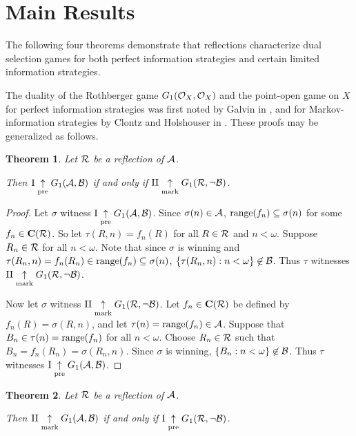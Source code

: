 \documentclass{amsart}
\theoremstyle{plain}
\newtheorem{theorem}{Theorem}
\theoremstyle{definition}
\theoremstyle{remark}
\theoremstyle{plain}
\theoremstyle{definition}
\theoremstyle{remark}
\begin{document}
\section{Main Results}

The following four theorems demonstrate that reflections characterize
dual selection games for both perfect information strategies and
certain limited information strategies.

The duality of the Rothberger game \(G_{1}(\mathcal{O}_X,\mathcal{O}_X)\)
and the point-open game on \(X\) for perfect information strategies
was first noted by Galvin in \cite{MR0493925}, and
for Markov-information strategies by Clontz and Holshouser in
\cite{2018arXiv180606001C}. These proofs may be generalized as follows.

\begin{theorem}
  Let \(\mathcal{R}\) be a reflection of \(\mathcal{A}\). 

  Then
  \(\mathrm{I}\underset{\text{pre}}{\uparrow}G_{1}(\mathcal{A},\mathcal{B})\) if and only if
  \(\mathrm{II}\underset{\text{mark}}{\uparrow}G_{1}(\mathcal{R},\neg\mathcal{B})\).
\end{theorem}

\begin{proof}
  Let \(\sigma\) witness 
  \(\mathrm{I}\underset{\text{pre}}{\uparrow}G_{1}(\mathcal{A},\mathcal{B})\).
  Since \(\sigma(n)\in\mathcal{A}\),
  \(\text{range}(f_n)\subseteq\sigma(n)\)
  for some \(f_n\in\mathbf C(\mathcal{R})\). So let
  \(\tau(R,n)=f_n(R)\) for all \(R\in \mathcal{R}\) and \(n<\omega\).
  Suppose \(R_n\in \mathcal{R}\) for all \(n<\omega\).
  Note that since \(\sigma\) is winning and 
  \(\tau(R_n,n)=f_n(R_n)\in\text{range}(f_n)\subseteq\sigma(n)\),
  \(\{\tau(R_n,n):n<\omega\}\not\in\mathcal{B}\). Thus \(\tau\) witnesses
  \(\mathrm{II}\underset{\text{mark}}{\uparrow}G_{1}(\mathcal{R},\neg\mathcal{B})\).

  Now let \(\sigma\) witness
  \(\mathrm{II}\underset{\text{mark}}{\uparrow}G_{1}(\mathcal{R},\neg\mathcal{B})\).
  Let \(f_n\in\mathbf C(\mathcal{R})\) be defined by \(f_n(R)=\sigma(R,n)\),
  and let \(\tau(n)=\text{range}(f_n)\in\mathcal{A}\). 
  Suppose that \(B_n\in\tau(n)=\text{range}(f_n)\) for
  all \(n<\omega\). Choose \(R_n\in\mathcal{R}\) such that 
  \(B_n=f_n(R_n)=\sigma(R_n,n)\). Since \(\sigma\) is winning,
  \(\{B_n:n<\omega\}\not\in\mathcal{B}\). Thus \(\tau\) witnesses
  \(\mathrm{I}\underset{\text{pre}}{\uparrow}G_{1}(\mathcal{A},\mathcal{B})\).
\end{proof}

\begin{theorem}
  Let \(\mathcal{R}\) be a reflection of \(\mathcal{A}\). 

  Then
  \(\mathrm{II}\underset{\text{mark}}{\uparrow}G_{1}(\mathcal{A},\mathcal{B})\) if and only if
  \(\mathrm{I}\underset{\text{pre}}{\uparrow}G_{1}(\mathcal{R},\neg\mathcal{B})\).
\end{theorem}
\end{document}

